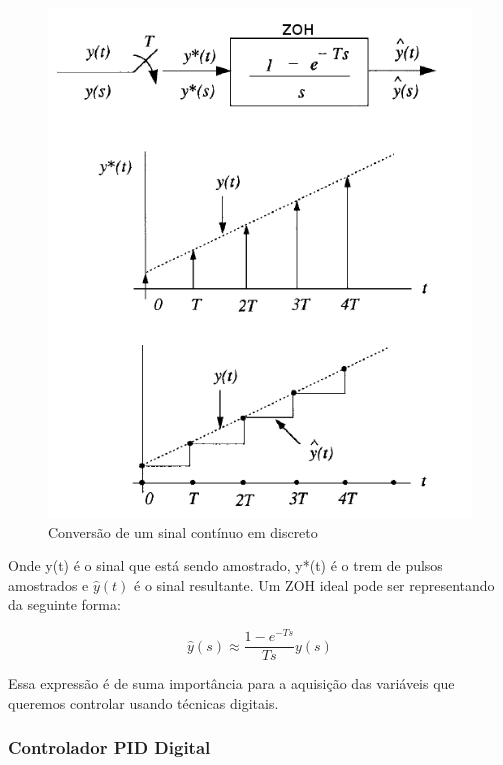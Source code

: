 \begin{figure}[H]
  \caption{Conversão de um sinal contínuo em discreto}
  \begin{center}
      \includegraphics[scale=0.65]{referencial/img/zoh_wie_p155}
  \end{center}
  \label{fig:zoh_wie_p155}
\end{figure}

Onde y(t) é o sinal que está sendo amostrado, y*(t) é o trem de pulsos amostrados e $\hat{y}(t)$ é o sinal resultante. Um ZOH ideal pode ser representando da seguinte forma:

\begin{equation}
  \hat{y}(s) \approx \frac{1-e^{-Ts}}{Ts}y(s)
\end{equation}

Essa expressão é de suma importância para a aquisição das variáveis que queremos controlar usando técnicas digitais.



\subsubsection{Controlador PID Digital}


